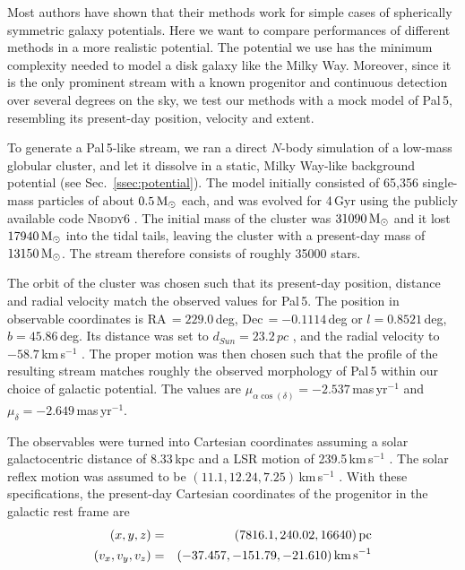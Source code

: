 Most authors have shown that their methods work for simple cases of spherically symmetric galaxy potentials. Here we want to compare performances of different methods in a more realistic potential. The potential we use has the minimum complexity needed to model a disk galaxy like the Milky Way. Moreover, since it is the only prominent stream with a known progenitor and continuous detection over several degrees on the sky, we test our methods with a mock model of Pal\,5, resembling its present-day position, velocity and extent.

To generate a Pal\,5-like stream, we ran a direct $N$-body simulation of a low-mass globular cluster, and let it dissolve in a static, Milky Way-like background potential (see Sec.~\ref{ssec:potential}). The model initially consisted of 65,356 single-mass particles of about $0.5\mbox{$\,{\rm M}_\odot$}$ each, and was evolved for 4\,Gyr using the publicly available code \textsc{Nbody6} \citep{Aarseth03, Nitadori12}. The initial mass of the cluster was $31090\mbox{$\,{\rm M}_\odot$}$ and it lost $17940\mbox{$\,{\rm M}_\odot$}$ into the tidal tails, leaving the cluster with a present-day mass of $13150\mbox{$\,{\rm M}_\odot$}$. The stream therefore consists of roughly 35000 stars.

The orbit of the cluster was chosen such that its present-day position, distance and radial velocity match the observed values for Pal\,5. The position in observable coordinates is RA\,$ = 229.0$\,deg, Dec\,$ = -0.1114$\,deg or $l = 0.8521$\,deg, $b = 45.86$\,deg. Its distance was set to $d_{Sun} = 23.2\,pc$ \citep{Harris96}, and the radial velocity to $-58.7$\,km\,s$^{-1}$ \citep{Odenkirchen02}. The proper motion was then chosen such that the profile of the resulting stream matches roughly the observed morphology of Pal\,5 within our choice of galactic potential. The values are $\mu_{\alpha\cos(\delta)}=-2.537$\,mas\,yr$^{-1}$ and $\mu_\delta = -2.649$\,mas\,yr$^{-1}$.

The observables were turned into Cartesian coordinates assuming a solar galactocentric distance of 8.33\,kpc and a LSR motion of 239.5\,km\,s$^{-1}$ \citep{Gillessen09}. The solar reflex motion was assumed to be $(11.1, 12.24, 7.25)$\,km\,s$^{-1}$ \citep{Schonrich10}. With these specifications, the present-day Cartesian coordinates of the progenitor in the galactic rest frame are 
\begin{eqnarray}
  (x, y, z) &=& (7816.1,  240.02,  16640)\,\mbox{pc}\\
  (v_x, v_y, v_z) &=& (-37.457, -151.79, -21.610)\,\mbox{km\,s}^{-1}
\end{eqnarray}

